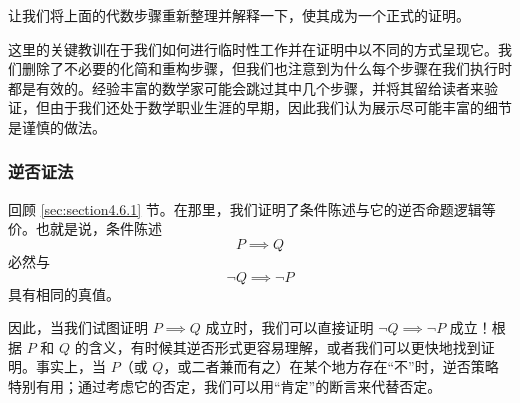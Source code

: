 让我们将上面的代数步骤重新整理并解释一下，使其成为一个正式的证明。

\begin{center}
    \noindent {}
\end{center}

这里的关键教训在于我们如何进行临时性工作并在证明中以不同的方式呈现它。我们删除了不必要的化简和重构步骤，但我们也注意到为什么每个步骤在我们执行时都是有效的。经验丰富的数学家可能会跳过其中几个步骤，并将其留给读者来验证，但由于我们还处于数学职业生涯的早期，因此我们认为展示尽可能丰富的细节是谨慎的做法。

\subsubsection*{逆否证法}

回顾 \ref{sec:section4.6.1} 节。在那里，我们证明了条件陈述与它的逆否命题逻辑等价。也就是说，条件陈述
\[P \implies Q\]
必然与
\[\neg Q \implies \neg P\]
具有相同的真值。

因此，当我们试图证明 $P \implies Q$ 成立时，我们可以直接证明 $\neg Q \implies \neg P$ 成立！根据 $P$ 和 $Q$ 的含义，有时候其逆否形式更容易理解，或者我们可以更快地找到证明。事实上，当 $P$（或 $Q$，或二者兼而有之）在某个地方存在``不''时，逆否策略特别有用；通过考虑它的否定，我们可以用``肯定''的断言来代替否定。


